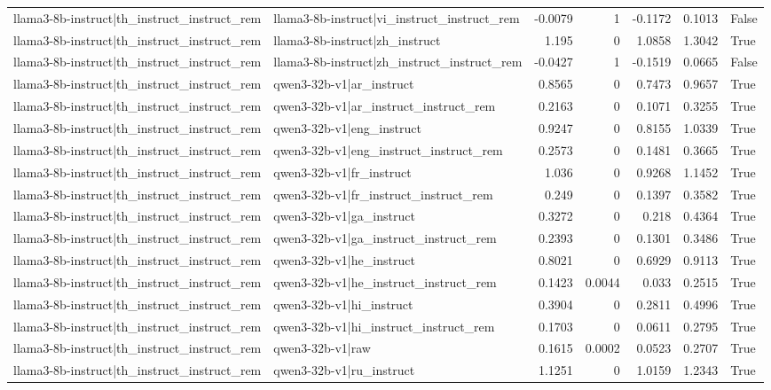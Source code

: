 \begin{table}
\begin{tabular}{l l r r r r l}
llama3-8b-instruct|th_instruct_instruct_rem & llama3-8b-instruct|vi_instruct_instruct_rem & -0.0079 & 1 & -0.1172 & 0.1013 & False \\
llama3-8b-instruct|th_instruct_instruct_rem & llama3-8b-instruct|zh_instruct & 1.195 & 0 & 1.0858 & 1.3042 & True \\
llama3-8b-instruct|th_instruct_instruct_rem & llama3-8b-instruct|zh_instruct_instruct_rem & -0.0427 & 1 & -0.1519 & 0.0665 & False \\
llama3-8b-instruct|th_instruct_instruct_rem & qwen3-32b-v1|ar_instruct & 0.8565 & 0 & 0.7473 & 0.9657 & True \\
llama3-8b-instruct|th_instruct_instruct_rem & qwen3-32b-v1|ar_instruct_instruct_rem & 0.2163 & 0 & 0.1071 & 0.3255 & True \\
llama3-8b-instruct|th_instruct_instruct_rem & qwen3-32b-v1|eng_instruct & 0.9247 & 0 & 0.8155 & 1.0339 & True \\
llama3-8b-instruct|th_instruct_instruct_rem & qwen3-32b-v1|eng_instruct_instruct_rem & 0.2573 & 0 & 0.1481 & 0.3665 & True \\
llama3-8b-instruct|th_instruct_instruct_rem & qwen3-32b-v1|fr_instruct & 1.036 & 0 & 0.9268 & 1.1452 & True \\
llama3-8b-instruct|th_instruct_instruct_rem & qwen3-32b-v1|fr_instruct_instruct_rem & 0.249 & 0 & 0.1397 & 0.3582 & True \\
llama3-8b-instruct|th_instruct_instruct_rem & qwen3-32b-v1|ga_instruct & 0.3272 & 0 & 0.218 & 0.4364 & True \\
llama3-8b-instruct|th_instruct_instruct_rem & qwen3-32b-v1|ga_instruct_instruct_rem & 0.2393 & 0 & 0.1301 & 0.3486 & True \\
llama3-8b-instruct|th_instruct_instruct_rem & qwen3-32b-v1|he_instruct & 0.8021 & 0 & 0.6929 & 0.9113 & True \\
llama3-8b-instruct|th_instruct_instruct_rem & qwen3-32b-v1|he_instruct_instruct_rem & 0.1423 & 0.0044 & 0.033 & 0.2515 & True \\
llama3-8b-instruct|th_instruct_instruct_rem & qwen3-32b-v1|hi_instruct & 0.3904 & 0 & 0.2811 & 0.4996 & True \\
llama3-8b-instruct|th_instruct_instruct_rem & qwen3-32b-v1|hi_instruct_instruct_rem & 0.1703 & 0 & 0.0611 & 0.2795 & True \\
llama3-8b-instruct|th_instruct_instruct_rem & qwen3-32b-v1|raw & 0.1615 & 0.0002 & 0.0523 & 0.2707 & True \\
llama3-8b-instruct|th_instruct_instruct_rem & qwen3-32b-v1|ru_instruct & 1.1251 & 0 & 1.0159 & 1.2343 & True \\

\end{tabular}
\end{table}
